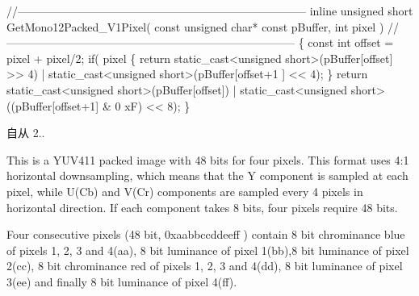 \begin{Desc}
\begin{description}
\begin{DoxyCode}
\textcolor{comment}{//-----------------------------------------------------------------------------}
\textcolor{keyword}{inline} \textcolor{keywordtype}{unsigned} \textcolor{keywordtype}{short} GetMono12Packed\_V1Pixel( \textcolor{keyword}{const} \textcolor{keywordtype}{unsigned} \textcolor{keywordtype}{char}* \textcolor{keyword}{const} pBuffer, \textcolor{keywordtype}{int} pixel )
\textcolor{comment}{//-----------------------------------------------------------------------------}
\{
  \textcolor{keyword}{const} \textcolor{keywordtype}{int} offset = pixel + pixel/2;
  \textcolor{keywordflow}{if}( pixel %
  \{
    \textcolor{keywordflow}{return} \textcolor{keyword}{static\_cast<}\textcolor{keywordtype}{unsigned} \textcolor{keywordtype}{short}\textcolor{keyword}{>}(pBuffer[offset] >> 4) | static\_cast<unsigned short>(pBuffer[offset+1
      ] << 4);
  \}
  \textcolor{keywordflow}{return} \textcolor{keyword}{static\_cast<}\textcolor{keywordtype}{unsigned} \textcolor{keywordtype}{short}\textcolor{keyword}{>}(pBuffer[offset]) | static\_cast<unsigned short>((pBuffer[offset+1] & 0
      xF) << 8);
\}
\end{DoxyCode}


\begin{DoxySince}{自从}
2.. 
\end{DoxySince}
\item[{\em 
\hypertarget{group___common_interface_gga02e0fc32ff10e0bc0f2e8b9c321d65c9a5b3ecdd0ab184432777c76d230e939cb}{idpf\+Y\+U\+V411\+\_\+\+U\+Y\+Y\+V\+Y\+Y\+\_\+\+Packed}\label{group___common_interface_gga02e0fc32ff10e0bc0f2e8b9c321d65c9a5b3ecdd0ab184432777c76d230e939cb}
}]This is a Y\+U\+V411 packed image with 48 bits for four pixels. This format uses 4\+:1 horizontal downsampling, which means that the Y component is sampled at each pixel, while U(\+Cb) and V(\+Cr) components are sampled every 4 pixels in horizontal direction. If each component takes 8 bits, four pixels require 48 bits.

Four consecutive pixels (48 bit, 0xaabbccddeeff ) contain 8 bit chrominance blue of pixels 1, 2, 3 and 4(aa), 8 bit luminance of pixel 1(bb),8 bit luminance of pixel 2(cc), 8 bit chrominance red of pixels 1, 2, 3 and 4(dd), 8 bit luminance of pixel 3(ee) and finally 8 bit luminance of pixel 4(ff).


\end{description}
\end{Desc}
